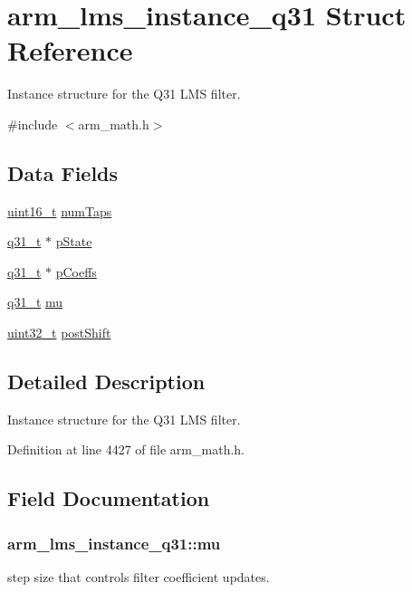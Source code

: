 \hypertarget{structarm__lms__instance__q31}{\section{arm\-\_\-lms\-\_\-instance\-\_\-q31 Struct Reference}
\label{structarm__lms__instance__q31}
}


Instance structure for the Q31 L\-M\-S filter.  




{\ttfamily \#include $<$arm\-\_\-math.\-h$>$}

\subsection*{Data Fields}
\begin{DoxyCompactItemize}
\item 
\hyperlink{stdint_8h_a273cf69d639a59973b6019625df33e30}{uint16\-\_\-t} \hyperlink{structarm__lms__instance__q31_ac0d84f7d054555931ef8a62511fbcb8a}{num\-Taps}
\item 
\hyperlink{arm__math_8h_adc89a3547f5324b7b3b95adec3806bc0}{q31\-\_\-t} $\ast$ \hyperlink{structarm__lms__instance__q31_a206d47b49de6f357f933ebe61520753c}{p\-State}
\item 
\hyperlink{arm__math_8h_adc89a3547f5324b7b3b95adec3806bc0}{q31\-\_\-t} $\ast$ \hyperlink{structarm__lms__instance__q31_a4afe56e991a5416adfd462aa88bda500}{p\-Coeffs}
\item 
\hyperlink{arm__math_8h_adc89a3547f5324b7b3b95adec3806bc0}{q31\-\_\-t} \hyperlink{structarm__lms__instance__q31_acb6ca9996b3c5f740d5d6c8e9f4f1d46}{mu}
\item 
\hyperlink{stdint_8h_a435d1572bf3f880d55459d9805097f62}{uint32\-\_\-t} \hyperlink{structarm__lms__instance__q31_a4705a8f0011bb9166e09bf5bd51e595e}{post\-Shift}
\end{DoxyCompactItemize}


\subsection{Detailed Description}
Instance structure for the Q31 L\-M\-S filter. 

Definition at line 4427 of file arm\-\_\-math.\-h.



\subsection{Field Documentation}
\hypertarget{structarm__lms__instance__q31_acb6ca9996b3c5f740d5d6c8e9f4f1d46}{
\subsubsection[{mu}]{ arm\-\_\-lms\-\_\-instance\-\_\-q31\-::mu}}\label{structarm__lms__instance__q31_acb6ca9996b3c5f740d5d6c8e9f4f1d46}
step size that controls filter coefficient updates. 

